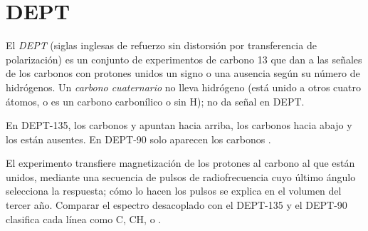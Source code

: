 \section{DEPT}

\begin{definition}[DEPT]\label{def:b2:structure-determination:dept}
El \emph{DEPT} (siglas inglesas de refuerzo sin distorsión por transferencia de polarización) es un conjunto de experimentos
de carbono 13 que dan a las señales de los carbonos con protones unidos un signo o una ausencia según
su número de hidrógenos. Un \emph{carbono cuaternario} no lleva hidrógeno
(está unido a otros cuatro átomos, o es un carbono carbonílico o  sin H); no da señal en DEPT.
\end{definition}

\begin{proposition}\label{prop:b2:structure-determination:dept}
En DEPT-135, los carbonos  y  apuntan hacia arriba, los carbonos  hacia abajo y los 
están ausentes. En DEPT-90 solo aparecen los carbonos .
\end{proposition}

\admitted

El experimento transfiere magnetización de los protones al carbono al que están unidos, mediante una
secuencia de pulsos de radiofrecuencia cuyo último ángulo selecciona la respuesta; cómo lo hacen los pulsos se
explica en el volumen del tercer año. Comparar el espectro desacoplado con el DEPT-135 y el DEPT-90 clasifica cada
línea como C, CH,  o .

